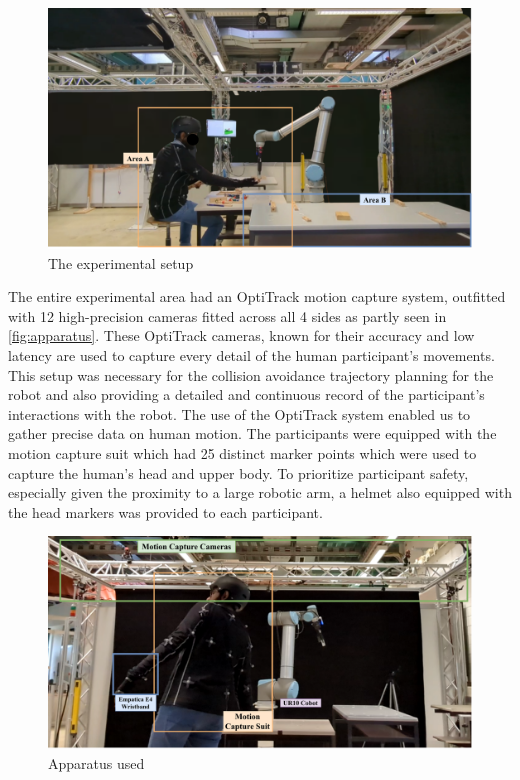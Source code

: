  
\begin{figure}[h] 

    \centering 

    \includegraphics[width=0.7\columnwidth]{images/handover.pdf} 

    \caption{The experimental setup} 

    \label{fig:setup} 

\end{figure} 



The entire experimental area had an OptiTrack motion capture system, outfitted with 12 high-precision cameras fitted across all 4 sides as partly seen in \autoref{fig:apparatus}. These OptiTrack cameras, known for their accuracy and low latency are used to capture every detail of the human participant's movements. This setup was necessary for the collision avoidance trajectory planning for the robot and also providing a detailed and continuous record of the participant's interactions with the robot. The use of the OptiTrack system enabled us to gather precise data on human motion. The participants were equipped with the motion capture suit which had 25 distinct marker points which were used to capture the human's head and upper body. To prioritize participant safety, especially given the proximity to a large robotic arm, a helmet also equipped with the head markers was provided to each participant.

\begin{figure}[hb]
	\centering
	\includegraphics[width=0.8\columnwidth]{images/apparatus.pdf}
	\caption{Apparatus used}
	\label{fig:apparatus}
\end{figure}

